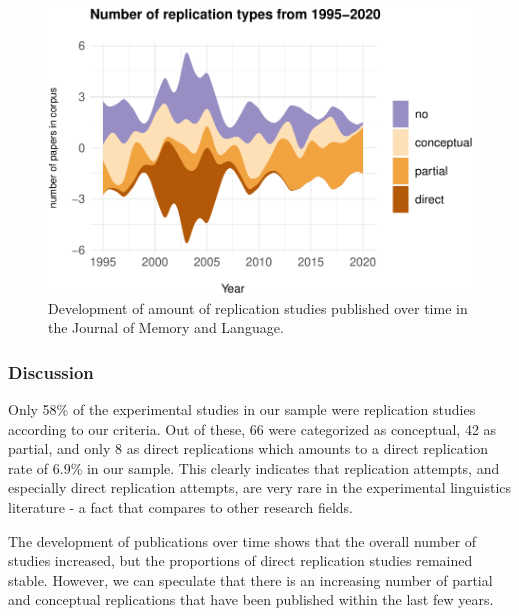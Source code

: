 \documentclass[]{elsarticle} %
\begin{document}
\begin{figure}

{\centering \includegraphics[width=1\linewidth]{ReplicationLing_files/figure-latex/jml_stream_plot-1} 

}

\caption{Development of amount of replication studies published over time in the Journal of Memory and Language.}\label{fig:jml_stream_plot}
\end{figure}

\hypertarget{discussion-1}{%
\subsubsection{Discussion}\label{discussion-1}}

Only 58\% of the experimental studies in our sample were replication
studies according to our criteria. Out of these, 66 were categorized as
conceptual, 42 as partial, and only 8 as direct replications which
amounts to a direct replication rate of 6.9\% in our sample. This
clearly indicates that replication attempts, and especially direct
replication attempts, are very rare in the experimental linguistics
literature - a fact that compares to other research fields.

The development of publications over time shows that the overall number
of studies increased, but the proportions of direct replication studies
remained stable. However, we can speculate that there is an increasing
number of partial and conceptual replications that have been published
within the last few years.
\end{document}
